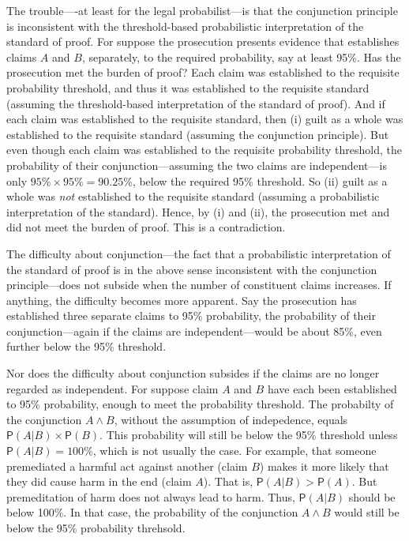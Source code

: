\documentclass[10pt,dvipsnames,enabledeprecatedfontcommands]{scrartcl}
\newcommand{\et}{\wedge}
\newcommand{\pr}[1]{\mathsf{P}(#1)}
\begin{document}
The trouble----at least for the legal probabilist---is that the
conjunction principle is inconsistent with the threshold-based
probabilistic interpretation of the standard of
proof. For suppose
the prosecution presents evidence that establishes claims \(A\) and
\(B\), separately, to the required probability, say at least 95\%. Has
the prosecution met the burden of proof? Each claim was established to
the requisite probability threshold, and thus it was established to the
requisite standard (assuming the threshold-based interpretation of the
standard of proof). And if each claim was established to the requisite
standard, then (i) guilt as a whole was established to the requisite
standard (assuming the conjunction principle). But even though each
claim was established to the requisite probability threshold, the
probability of their conjunction---assuming the two claims are
independent---is only \(95\%\times95\%=90.25\%\), below the required
95\% threshold. So (ii) guilt as a whole was \textit{not} established to
the requisite standard (assuming a probabilistic interpretation of the
standard). Hence, by (i) and (ii), the prosecution met and did not meet
the burden of proof. This is a contradiction.

The difficulty about conjunction---the fact that a probabilistic
interpretation of the standard of proof is in the above sense
inconsistent with the conjunction principle---does not subside when the
number of constituent claims increases. If anything, the difficulty
becomes more apparent. Say the prosecution has established three
separate claims to 95\% probability, the probability of their
conjunction---again if the claims are independent---would be about 85\%,
even further below the 95\% threshold.

Nor does the difficulty about conjunction subsides if the claims are no
longer regarded as independent. For suppose claim \(A\) and \(B\) have
each been established to 95\% probability, enough to meet the
probability threshold. The probabilty of the conjunction \(A \et B\),
without the assumption of indepedence, equals
\(\pr{A | B} \times \pr{B}\). This probability will still be below the
95\% threshold unless \(\pr{A | B}=100\%\), which is not usually the
case.
For example, that someone premediated a harmful act against another
(claim \(B\)) makes it more likely that they did cause harm in the end
(claim \(A\)). That is, \(\pr{A | B} > \pr{A}\). But premeditation of
harm does not always lead to harm. Thus, \(\pr{A | B}\) should be below
100\%. In that case, the probability of the conjunction \(A \et B\)
would still be below the 95\% probability
threhsold.
\end{document}
